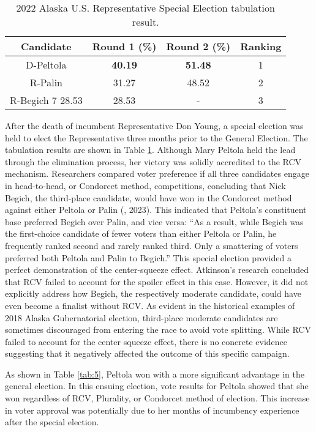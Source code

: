 \begin{table}[h]
\centering
\begin{tabular}{|c|c|c|c|}
\hline
Candidate & Round 1 (\%) & Round 2 (\%) & Ranking \\\hline
D-Peltola & \textbf{40.19} & \textbf{51.48} & 1 \\ \hline
R-Palin & 31.27 & 48.52 & 2 \\ \hline
R-Begich 7 28.53 & 28.53 & - & 3 \\ \hline
\end{tabular}
\caption{2022 Alaska U.S. Representative Special Election tabulation result.}
\label{tab:6}
\end{table}

After the death of incumbent Representative Don Young, a special election was held to elect the Representative three months prior to the General Election. The tabulation results are shown in Table \ref{tab:6}. Although Mary Peltola held the lead through the elimination process, her victory was solidly accredited to the RCV mechanism. Researchers compared voter preference if all three candidates engage in head-to-head, or Condorcet method, competitions, concluding that Nick Begich, the third-place candidate, would have won in the Condorcet method against either Peltola or Palin (\cite{atkinson2023}, 2023). This indicated that Peltola’s constituent base preferred Begich over Palin, and vice versa: “As a result, while Begich was the first-choice candidate of fewer voters than either Peltola or Palin, he frequently ranked second and rarely ranked third. Only a smattering of voters preferred both Peltola and Palin to Begich.” This special election provided a perfect demonstration of the center-squeeze effect. Atkinson’s research concluded that RCV failed to account for the spoiler effect in this case. However, it did not explicitly address how Begich, the respectively moderate candidate, could have even become a finalist without RCV. As evident in the historical examples of 2018 Alaska Gubernatorial election, third-place moderate candidates are sometimes discouraged from entering the race to avoid vote splitting. While RCV failed to account for the center squeeze effect, there is no concrete evidence suggesting that it negatively affected the outcome of this specific campaign. 

As shown in Table \ref{tab:5}, Peltola won with a more significant advantage in the general election. In this ensuing election, vote results for Peltola showed that she won regardless of RCV, Plurality, or Condorcet method of election. This increase in voter approval was potentially due to her months of incumbency experience after the special election. 

